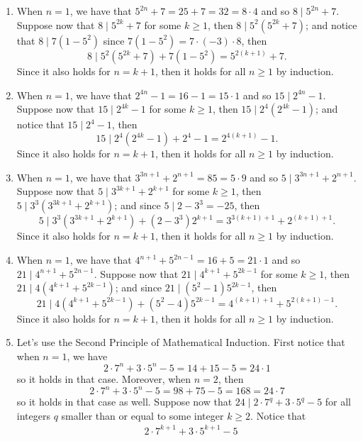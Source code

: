 \begin{solution}
    \begin{enumerate}
        \item When $n = 1$, we have that $5^{2n} + 7 = 25 + 7 = 32 = 8\cdot 4$ and so $8 \mid 5^{2n} + 7$. Suppose now that $8 \mid 5^{2k} + 7$ for some $k \geq 1$, then $8 \mid 5^2(5^{2k} + 7)$; and notice that $8 \mid 7(1 - 5^2)$ since $7(1 - 5^2) = 7 \cdot (-3) \cdot 8$, then 
        $$8 \mid 5^2(5^{2k} + 7) + 7(1 - 5^2) = 5^{2(k+1)} + 7.$$
        Since it also holds for $n = k+1$, then it holds for all $n \geq 1$ by induction.
        \item When $n = 1$, we have that $2^{4n} -1 = 16 -1 = 15\cdot 1$ and so $15 \mid 2^{4n} -1$. Suppose now that $15 \mid 2^{4k} - 1$ for some $k \geq 1$, then $15 \mid 2^4(2^{4k} - 1)$; and notice that $15 \mid 2^4 - 1$, then 
        $$15 \mid 2^4(2^{4k} - 1) + 2^4 - 1 = 2^{4(k+1)} - 1.$$
        Since it also holds for $n = k+1$, then it holds for all $n \geq 1$ by induction.
        \item When $n = 1$, we have that $3^{3n+1} + 2^{n+1} = 85 = 5\cdot 9$ and so $5 \mid 3^{3n+1} + 2^{n+1}$. Suppose now that $5 \mid 3^{3k+1} + 2^{k+1}$ for some $k \geq 1$, then $5 \mid 3^3(3^{3k+1} + 2^{k+1})$; and since $5 \mid 2 - 3^3 = -25$, then 
        $$5 \mid 3^3(3^{3k+1} + 2^{k+1}) + (2 - 3^3)2^{k+1} = 3^{3(k+1)+1} + 2^{(k+1)+1}.$$
        Since it also holds for $n = k+1$, then it holds for all $n \geq 1$ by induction.
        \item When $n = 1$, we have that $4^{n+1} + 5^{2n-1} = 16 + 5 = 21\cdot 1$ and so $21 \mid 4^{n+1} + 5^{2n-1}$. Suppose now that $21 \mid 4^{k+1} + 5^{2k-1}$ for some $k \geq 1$, then $21 \mid 4(4^{k+1} + 5^{2k-1})$; and since $21 \mid (5^2 - 1)5^{2k-1}$, then 
        $$21 \mid 4(4^{k+1} + 5^{2k-1}) + (5^2 - 4)5^{2k-1} = 4^{(k+1)+1} + 5^{2(k+1)-1}.$$
        Since it also holds for $n = k+1$, then it holds for all $n \geq 1$ by induction.
        \item Let's use the Second Principle of Mathematical Induction. First notice that when $n = 1$, we have
        $$2\cdot 7^n + 3\cdot 5^n - 5 = 14 + 15 - 5 = 24\cdot 1$$
        so it holds in that case. Moreover, when $n = 2$, then
        $$2\cdot 7^n + 3\cdot 5^n - 5 = 98 + 75 - 5 = 168 = 24 \cdot 7$$
        so it holds in that case as well. Suppose now that $24 \mid 2\cdot 7^q + 3\cdot 5^q - 5$ for all integers $q$ smaller than or equal to some integer $k \geq 2$. Notice that 
        \begin{align*}
            & 2\cdot 7^{k+1} + 3\cdot 5^{k+1} - 5 \\

\end{align*}
\end{enumerate}
\end{solution}
